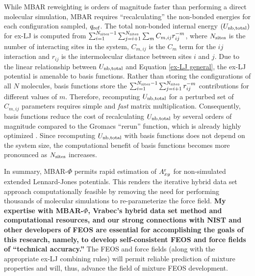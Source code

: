 \documentclass[12pt,a4paper]{article}
\begin{document}
While MBAR reweighting is orders of magnitude faster than performing a direct molecular simulation, MBAR requires ``recalculating'' the non-bonded energies for each configuration sampled, $q_{\rm ref}$. The total non-bonded internal energy $(U_{\rm nb, total})$ for ex-LJ is computed from $\sum_{i=1}^{N_{\rm sites}-1} \sum_{j=i+1}^{N_{\rm sites}} \sum_m C_{m,ij} r_{ij}^{-m}$, where $N_{\rm sites}$ is the number of interacting sites in the system, $C_{m,ij}$ is the $C_{m}$ term for the $ij$ interaction and $r_{ij}$ is the intermolecular distance between sites $i$ and $j$. Due to the linear relationship between $U_{\rm nb, total}$ and Equation \ref{ex-LJ general}, the ex-LJ potential is amenable to basis functions. Rather than storing the configurations of all $N$ molecules, basis functions store the $\sum_{i=1}^{N_{\rm sites}-1} \sum_{j=i+1}^{N_{\rm sites}} r_{ij}^{-m}$ contributions for different values of $m$. Therefore, recomputing $U_{\rm nb, total}$ for a perturbed set of $C_{m,ij}$ parameters requires simple and \textit{fast} matrix multiplication. Consequently, basis functions reduce the cost of recalculating $U_{\rm nb, total}$ by several orders of magnitude compared to the Gromacs ``rerun'' function, which is already highly optimized \cite{GROMACS_2018}. Since recomputing $U_{\rm nb, total}$ with basis functions does not depend on the system size, the computational benefit of basis functions becomes more pronounced as $N_{\rm sites}$ increases.

In summary, MBAR-$\Phi$ permits rapid estimation of $A_{xy}^{\rm r}$ for non-simulated extended Lennard-Jones potentials. This renders the iterative hybrid data set approach computationally feasible by removing the need for performing thousands of molecular simulations to re-parameterize the force field. \textbf{My expertise with MBAR-$\Phi$, Vrabec's hybrid data set method and computational resources, and our strong connections with NIST and other developers of FEOS are essential for accomplishing the goals of this research, namely, to develop self-consistent FEOS and force fields of ``technical accuracy.''} The FEOS and force fields (along with the appropriate ex-LJ combining rules) will permit reliable prediction of mixture properties and will, thus, advance the field of mixture FEOS development. 

\end{document}
